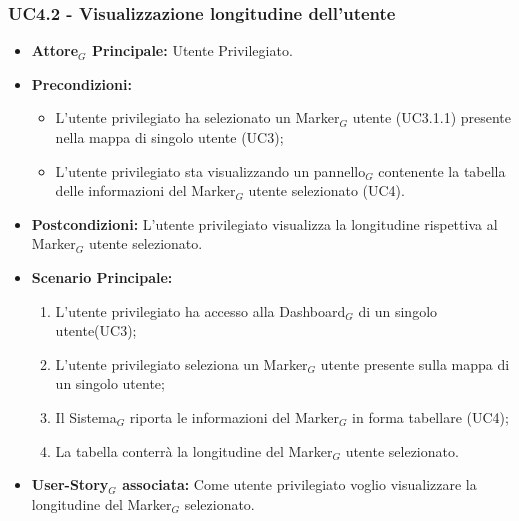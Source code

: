 \documentclass[10pt]{article}
\begin{document}
\begin{justify}
\subsubsection{\textbf{UC4.2 - Visualizzazione longitudine dell'utente}}
\label{UC4.2}
\begin{itemize}
     \item \textbf{Attore$_G$ Principale:} Utente Privilegiato.
     \item \textbf{Precondizioni:}
        \begin{itemize}
          \item L'utente privilegiato ha selezionato un Marker$_G$ utente (UC3.1.1) presente nella mappa di singolo utente (UC3);
          \item L'utente privilegiato sta visualizzando un pannello$_G$ contenente la tabella delle informazioni del Marker$_G$ utente selezionato (UC4).
        \end{itemize}
      \item \textbf{Postcondizioni:} L'utente privilegiato visualizza la longitudine rispettiva al Marker$_G$ utente selezionato. 
      \item \textbf{Scenario Principale:}
        \begin{enumerate}
            \item L'utente privilegiato ha accesso alla Dashboard$_G$ di un singolo utente(UC3);
            \item L'utente privilegiato seleziona un Marker$_G$ utente presente sulla mappa di un singolo utente;
            \item Il Sistema$_G$ riporta le informazioni del Marker$_G$ in forma tabellare (UC4);
            \item La tabella conterrà la longitudine del Marker$_G$ utente selezionato.
        \end{enumerate}
     \item \textbf{User-Story$_G$ associata:}
       Come utente privilegiato voglio visualizzare la longitudine del Marker$_G$ selezionato.
\end{itemize}


\end{justify}
\end{document}
